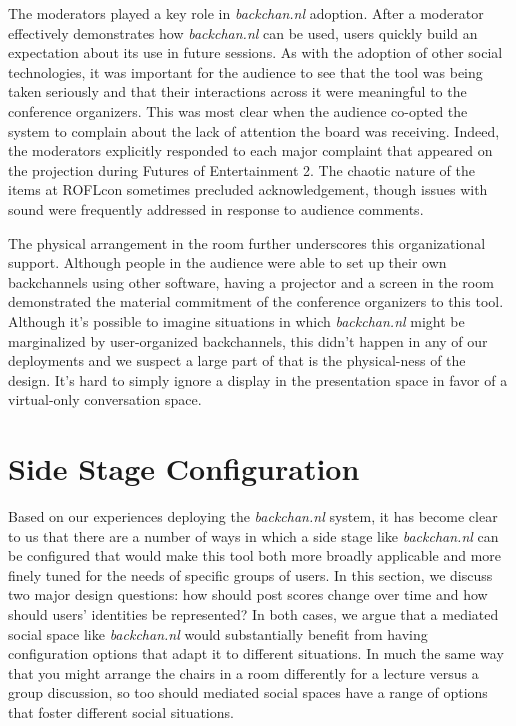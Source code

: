The moderators played a key role in \emph{backchan.nl} adoption. After a moderator effectively demonstrates how \emph{backchan.nl} can be used, users quickly build an expectation about its use in future sessions. As with the adoption of other social technologies, it was important for the audience to see that the tool was being taken seriously and that their interactions across it were meaningful to the conference organizers.\citep{Orlikowski:1992tza} This was most clear when the audience co-opted the system to complain about the lack of attention the board was receiving. Indeed, the moderators explicitly responded to each major complaint that appeared on the projection during Futures of Entertainment 2. The chaotic nature of the items at ROFLcon sometimes precluded acknowledgement, though issues with sound were frequently addressed in response to audience comments. 

The physical arrangement in the room further underscores this organizational support. Although people in the audience were able to set up their own backchannels using other software, having a projector and a screen in the room demonstrated the material commitment of the conference organizers to this tool. Although it's possible to imagine situations in which \emph{backchan.nl} might be marginalized by user-organized backchannels, this didn't happen in any of our deployments and we suspect a large part of that is the physical-ness of the design. It's hard to simply ignore a display in the presentation space in favor of a virtual-only conversation space.



\section{Side Stage Configuration}
Based on our experiences deploying the \emph{backchan.nl} system, it has become clear to us that there are a number of ways in which a side stage like \emph{backchan.nl} can be configured that would make this tool both more broadly applicable and more finely tuned for the needs of specific groups of users. In this section, we discuss two major design questions: how should post scores change over time and how should users' identities be represented? In both cases, we argue that a mediated social space like \emph{backchan.nl} would substantially benefit from having configuration options that adapt it to different situations. In much the same way that you might arrange the chairs in a room differently for a lecture versus a group discussion, so too should mediated social spaces have a range of options that foster different social situations.

